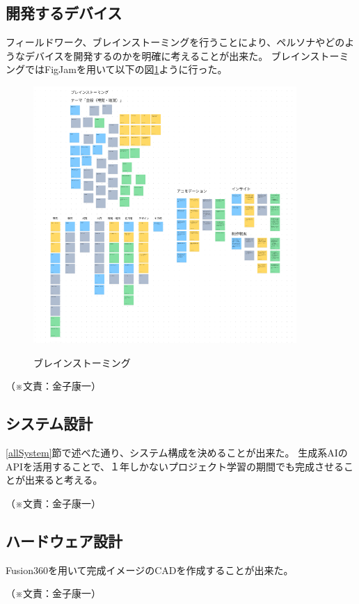 \documentclass[11pt,a4paper]{report}
\newcommand{\Writer}[1]{
  \normalsize
  \begin{flushright}
    （※文責：#1）
  \end{flushright}
}
\begin{document}
\subsection{開発するデバイス}
\noindent\space
フィールドワーク、ブレインストーミングを行うことにより、ペルソナやどのようなデバイスを開発するのかを明確に考えることが出来た。
ブレインストーミングではFigJamを用いて以下の図\ref{fig:figjam}ように行った。
\begin{figure}[htbp]
  \centering %
  \includegraphics[width=100mm]{images/figjam.png}\\
  \caption{ブレインストーミング}
  \label{fig:figjam}
\end{figure}
\Writer{金子康一}

\subsection{システム設計}
\noindent\space
\ref{allSystem}節で述べた通り、システム構成を決めることが出来た。
生成系AIのAPIを活用することで、１年しかないプロジェクト学習の期間でも完成させることが出来ると考える。
\Writer{金子康一}

\subsection{ハードウェア設計}
\noindent\space
Fusion360を用いて完成イメージのCADを作成することが出来た。
\Writer{金子康一}
\end{document}
